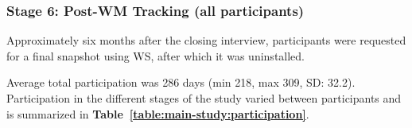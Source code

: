 


\subsubsection{Stage 6: Post-WM Tracking (all participants)}

Approximately six months after the closing interview, participants were requested for a final snapshot using WS, after which it was uninstalled.

Average total participation was 286 days (min 218, max 309, SD: 32.2). Participation in the different stages of the study varied between participants and is summarized in \textbf{Table~\ref{table:main-study:participation}}.




